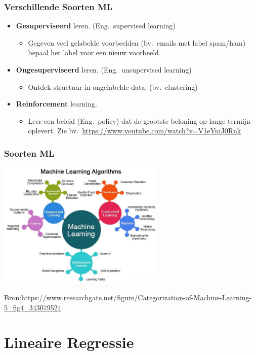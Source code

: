 \documentclass[aspectratio=169]{beamer}
\begin{document}
\begin{frame}
\frametitle{Verschillende Soorten ML}

\begin{itemize}
	\item \textbf{Gesuperviseerd} leren. (Eng.\ supervised learning)
	\begin{itemize}
		\item Gegeven veel gelabelde voorbeelden (bv.\ emails met label spam/ham) bepaal het label voor een nieuw voorbeeld.
	\end{itemize}
	\item \textbf{Ongesuperviseerd} leren. (Eng.\ unsupervised learning)	
	\begin{itemize}
		\item Ontdek structuur in ongelabelde data. (bv.\ clustering)
	\end{itemize}
	\item \textbf{Reinforcement} learning.
	\begin{itemize}
		\item Leer een beleid (Eng.\ policy) dat de grootste beloning op lange termijn oplevert.
		Zie bv.\ \url{https://www.youtube.com/watch?v=V1eYniJ0Rnk}
	\end{itemize}
\end{itemize}
\end{frame}

\begin{frame}
\frametitle{Soorten ML}
	\begin{center}
		\includegraphics[width=0.6\textwidth]{graphics/soorten-ml}		
	\end{center}
	\tiny{Bron:\url{https://www.researchgate.net/figure/Categorization-of-Machine-Learning-5_fig4_343079524}}
\end{frame}

\section{Lineaire Regressie}
\end{document}
